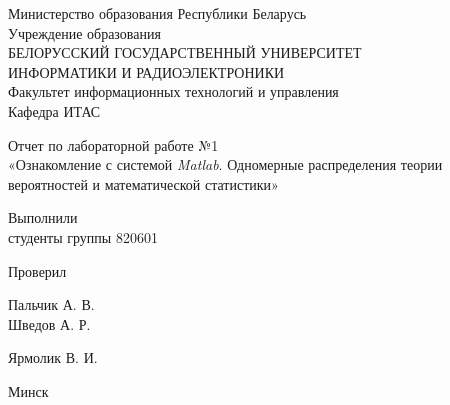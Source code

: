 \begin{titlepage}
\thispagestyle{empty}
\setlength{\parindent}{0ex} %

\begin{center}
  Министерство образования Республики Беларусь \\
  \vspace{0.5ex}
  Учреждение образования \\
  БЕЛОРУССКИЙ ГОСУДАРСТВЕННЫЙ УНИВЕРСИТЕТ \\
  ИНФОРМАТИКИ И РАДИОЭЛЕКТРОНИКИ \\
  \vspace{0.5ex}
  Факультет информационных технологий и управления \\
  \vspace{0.5ex}
  Кафедра ИТАС
\end{center}

\vspace{50mm}

\begin{center}
  Отчет по лабораторной работе №1 \\
  «Ознакомление с системой \textit{Matlab}. Одномерные распределения теории вероятностей и математической статистики»
\end{center}

\vspace{50mm}

\begin{minipage}{.4\linewidth}
    Выполнили \\
    студенты группы 820601

    \smallskip

    Проверил
\end{minipage}
\hfill
\begin{minipage}{.4\linewidth}
    \begin{flushright}
        Пальчик А. В.\\
        Шведов А. Р.

        \smallskip

        Ярмолик В. И.
    \end{flushright}
\end{minipage}

\vfill
\begin{center}
  Минск \the\year{}
\end{center}

\setlength{\parindent}{1.25cm} %
\end{titlepage}
